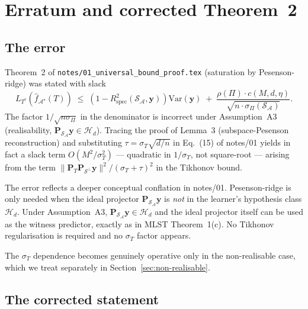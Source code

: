 \documentclass[11pt,a4paper]{article}
\theoremstyle{plain}
\theoremstyle{definition}
\theoremstyle{remark}
\newcommand{\by}{\mathbf{y}}
\newcommand{\bP}{\mathbf{P}}
\newcommand{\Var}{\mathrm{Var}}
\newcommand{\Rspec}{R^2_{\mathrm{spec}}}
\newcommand{\Scal}{\mathcal{S}}
\newcommand{\Acal}{\mathcal{A}}
\newcommand{\Hcal}{\mathcal{H}}
\begin{document}
\section{Erratum and corrected Theorem~2}
\label{sec:erratum}

\subsection{The error}

Theorem~2 of \texttt{notes/01\_universal\_bound\_proof.tex} (saturation by
Pesenson-ridge) was stated with slack
\begin{equation}
    L_{T^c}(\hat f_{\Acal^\star}(T))
    \;\leq\; (1 - \Rspec(\Scal_\Acal, \by)) \Var(\by)
        \;+\; \frac{\rho(\Pi) \cdot c(M, d, \eta)}{\sqrt{n \cdot \sigma_\Pi(\Scal_\Acal)}}.
    \label{eq:bad-thm2}
\end{equation}
The factor $1/\sqrt{n \sigma_\Pi}$ in the denominator is incorrect under
Assumption~A3 (realisability, $\bP_{\Scal_\Acal}\by \in \Hcal_d$).
Tracing the proof of Lemma~3 (subspace-Pesenson reconstruction) and
substituting $\tau = \sigma_T \sqrt{d/n}$ in Eq.~(15) of notes/01 yields
in fact a slack term $O(M^2 / \sigma_T^2)$ — quadratic in $1/\sigma_T$,
not square-root — arising from the term
$\|\bP_T \bP_{\Scal^\perp}\by\|^2/(\sigma_T + \tau)^2$
in the Tikhonov bound.

The error reflects a deeper conceptual conflation in notes/01.
Pesenson-ridge is only needed when the ideal projector $\bP_{\Scal_\Acal}\by$
is \emph{not} in the learner's hypothesis class $\Hcal_d$.  Under
Assumption~A3, $\bP_{\Scal_\Acal}\by \in \Hcal_d$ and the ideal projector
itself can be used as the witness predictor, exactly as in MLST
Theorem~1(c).  No Tikhonov regularisation is required and no $\sigma_T$
factor appears.

The $\sigma_T$ dependence becomes genuinely operative only in the
non-realisable case, which we treat separately in
Section~\ref{sec:non-realisable}.

\subsection{The corrected statement}
\end{document}
